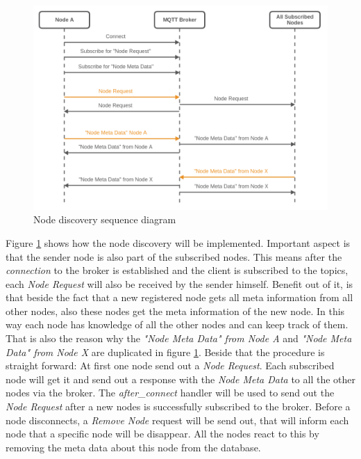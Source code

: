 \begin{figure}[H]
    \centering
    \includegraphics[width=\textwidth]{resources/images/node_discovery.png}
    \caption[Node discovery sequence diagram]{Node discovery sequence diagram}
    \label{fig:node_discovery_squ_dia}
\end{figure}

Figure \ref{fig:node_discovery_squ_dia} shows how the node discovery will be implemented.
Important aspect is that the sender node is also part of the subscribed nodes.
This means after the \textit{connection} to the broker is established and the client is subscribed to the topics, each \textit{Node Request} will also be received by the sender himself.
Benefit out of it, is that beside the fact that a new registered node gets all meta information from all other nodes, also these nodes get the meta information of the new node.
In this way each node has knowledge of all the other nodes and can keep track of them.
That is also the reason why the \textit{"Node Meta Data" from Node A} and \textit{"Node Meta Data" from Node X} are duplicated in figure \ref{fig:node_discovery_squ_dia}.
Beside that the procedure is straight forward: At first one node send out a \textit{Node Request}.
Each subscribed node will get it and send out a response with the \textit{Node Meta Data} to all the other nodes via the broker.
The \textit{after\_connect} handler will be used to send out the \textit{Node Request} after a new nodes is successfully subscribed to the broker.
Before a node disconnects, a \textit{Remove Node} request will be send out, that will inform each node that a specific node will be disappear.
All the nodes react to this by removing the meta data about this node from the database.


